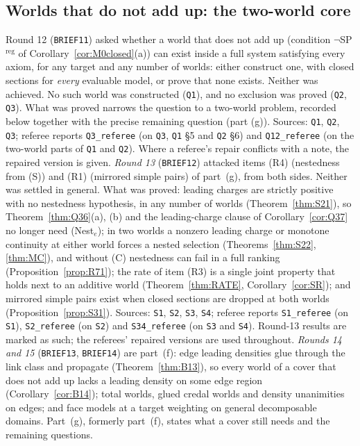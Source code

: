 \documentclass[11pt]{article}
\theoremstyle{definition}
\theoremstyle{remark}
\newcommand{\src}[1]{\texttt{#1}}
\begin{document}
\subsection{Worlds that do not add up: the two-world core}\label{sec:open-core}
Round 12 (\src{BRIEF11}) asked whether a world that does not add up (condition $\neg$SP$^{\mathrm{reg}}$ of Corollary~\ref{cor:M0closed}(a)) can exist inside a full system satisfying every axiom, for any target and any number of worlds: either construct one, with closed sections for \emph{every} evaluable model, or prove that none exists. Neither was achieved. No such world was constructed (\src{Q1}), and no exclusion was proved (\src{Q2}, \src{Q3}). What was proved narrows the question to a two-world problem, recorded below together with the precise remaining question (part (g)). Sources: \src{Q1}, \src{Q2}, \src{Q3}; referee reports \src{Q3\_referee} (on \src{Q3}, \src{Q1} \S5 and \src{Q2} \S6) and \src{Q12\_referee} (on the two-world parts of \src{Q1} and \src{Q2}). Where a referee's repair conflicts with a note, the repaired version is given. \emph{Round 13} (\src{BRIEF12}) attacked items (R4) (nestedness from (S)) and (R1) (mirrored simple pairs) of part~(g), from both sides. Neither was settled in general. What was proved: leading charges are strictly positive with no nestedness hypothesis, in any number of worlds (Theorem~\ref{thm:S21}), so Theorem~\ref{thm:Q36}(a), (b) and the leading-charge clause of Corollary~\ref{cor:Q37} no longer need (Nest$_e$); in two worlds a nonzero leading charge or monotone continuity at either world forces a nested selection (Theorems~\ref{thm:S22}, \ref{thm:MC}), and without (C) nestedness can fail in a full ranking (Proposition~\ref{prop:R71}); the rate of item (R3) is a single joint property that holds next to an additive world (Theorem~\ref{thm:RATE}, Corollary~\ref{cor:SR}); and mirrored simple pairs exist when closed sections are dropped at both worlds (Proposition~\ref{prop:S31}). Sources: \src{S1}, \src{S2}, \src{S3}, \src{S4}; referee reports \src{S1\_referee} (on \src{S1}), \src{S2\_referee} (on \src{S2}) and \src{S34\_referee} (on \src{S3} and \src{S4}). Round-13 results are marked as such; the referees' repaired versions are used throughout. \emph{Rounds 14 and 15} (\src{BRIEF13}, \src{BRIEF14}) are part~(f): edge leading densities glue through the link class and propagate (Theorem~\ref{thm:B13}), so every world of a cover that does not add up lacks a leading density on some edge region (Corollary~\ref{cor:B14}); total worlds, glued credal worlds and density unanimities on edges; and face models at a target weighting on general decomposable domains. Part~(g), formerly part~(f), states what a cover still needs and the remaining questions.
\end{document}

